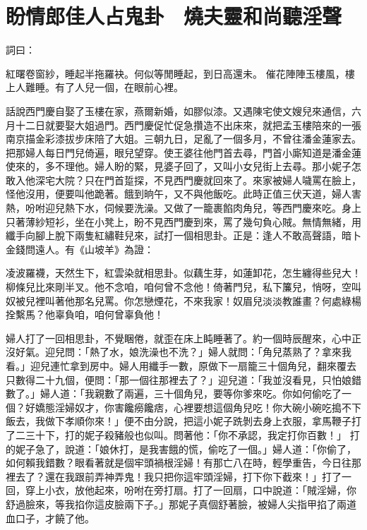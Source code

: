 %

\chapter{盼情郎佳人占鬼卦　燒夫靈和尚聽淫聲}

詞曰：

紅曙卷窗紗，睡起半拖羅袂。何似等閒睡起，到日高還未。
催花陣陣玉樓風，樓上人難睡。有了人兒一個，在眼前心裡。

話說西門慶自娶了玉樓在家，燕爾新婚，如膠似漆。又遇陳宅使文嫂兒來通信，六月十二日就要娶大姐過門。西門慶促忙促急攢造不出床來，就把孟玉樓陪來的一張南京描金彩漆拔步床陪了大姐。三朝九日，足亂了一個多月，不曾往潘金蓮家去。把那婦人每日門兒倚遍，眼兒望穿。使王婆往他門首去尋，門首小廝知道是潘金蓮使來的，多不理他。婦人盼的緊，見婆子回了，又叫小女兒街上去尋。那小妮子怎敢入他深宅大院？只在門首踅探，不見西門慶就回來了。來家被婦人噦罵在臉上，怪他沒用，便要叫他跪著。餓到晌午，又不與他飯吃。此時正值三伏天道，婦人害熱，吩咐迎兒熱下水，伺候要洗澡。又做了一籠裹餡肉角兒，等西門慶來吃。身上只著薄紗短衫，坐在小凳上，盼不見西門慶到來，罵了幾句負心賊。無情無緒，用纖手向腳上脫下兩隻紅繡鞋兒來，試打一個相思卦。正是：逢人不敢高聲語，暗卜金錢問遠人。有《山坡羊》為證：

凌波羅襪，天然生下，紅雲染就相思卦。似藕生芽，如蓮卸花，怎生纏得些兒大！柳條兒比來剛半叉。他不念咱，咱何曾不念他！倚著門兒，私下簾兒，悄呀，空叫奴被兒裡叫著他那名兒罵。你怎戀煙花，不來我家！奴眉兒淡淡教誰畫？何處綠楊拴繫馬？他辜負咱，咱何曾辜負他！

婦人打了一回相思卦，不覺睏倦，就歪在床上盹睡著了。約一個時辰醒來，心中正沒好氣。迎兒問：「熱了水，娘洗澡也不洗？」婦人就問：「角兒蒸熟了？拿來我看。」迎兒連忙拿到房中。婦人用纖手一數，原做下一扇籠三十個角兒，翻來覆去只數得二十九個，便問：「那一個往那裡去了？」迎兒道：「我並沒看見，只怕娘錯數了。」婦人道：「我親數了兩遍，三十個角兒，要等你爹來吃。你如何偷吃了一個？好嬌態淫婦奴才，你害饞癆饞痞，心裡要想這個角兒吃！你大碗小碗吃搗不下飯去，我做下孝順你來！」便不由分說，把這小妮子跣剝去身上衣服，拿馬鞭子打了二三十下，打的妮子殺豬般也似叫。問著他：「你不承認，我定打你百數！」 打的妮子急了，說道：「娘休打，是我害餓的慌，偷吃了一個。」婦人道：「你偷了，如何賴我錯數？眼看著就是個牢頭禍根淫婦！有那亡八在時，輕學重告，今日往那裡去了？還在我跟前弄神弄鬼！我只把你這牢頭淫婦，打下你下截來！」打了一回，穿上小衣，放他起來，吩咐在旁打扇。打了一回扇，口中說道：「賊淫婦，你舒過臉來，等我掐你這皮臉兩下子。」那妮子真個舒著臉，被婦人尖指甲掐了兩道血口子，才饒了他。

